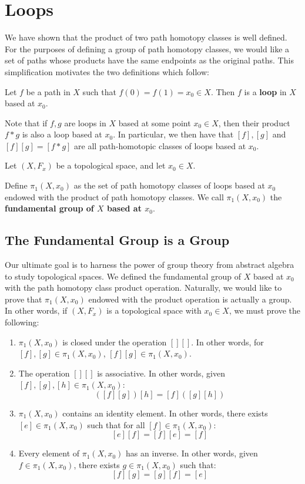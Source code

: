 

\section{Loops} We have shown that the product of two path homotopy classes is well defined. For the purposes of defining a group of path homotopy classes, we would like a set of paths whose products have the same endpoints as the original paths. This simplification motivates the two definitions which follow: 
\begin{definition}
	Let $f$ be a path in $X$ such that $f(0) = f(1) = x_0\in X$. Then $f$ is a \textbf{loop} in $X$ based at $x_0$. 
\end{definition}

Note that if $f,g$ are loops in $X$ based at some point $x_0\in X$, then their product $f*g$ is also a loop based at $x_0$. In particular, we then have that $[f],[g]$ and $[f][g] = [f*g]$ are all path-homotopic classes of loops based at $x_0$. 
\begin{definition}
	Let $(X,F_x)$ be a topological space, and let $x_0\in X$. 
	
	Define $\pi_1(X,x_0)$ as the set of path homotopy classes of loops based at $x_0$ endowed with the product of path homotopy classes. We call $\pi_1(X,x_0)$ the \textbf{fundamental group of $X$ based at $x_0$}. 
\end{definition}

\subsection{The Fundamental Group is a Group}

Our ultimate goal is to harness the power of group theory from abstract algebra to study topological spaces. We defined the fundamental group of $X$ based at $x_0$ with the path homotopy class product operation. Naturally, we would like to prove that $\pi_1(X,x_0)$ endowed with the product operation is actually a group. In other words, if $(X,F_x)$ is a topological space with $x_0\in X$, we must prove the following: 
\begin{enumerate}
	\item $\pi_1(X,x_0)$ is closed under the operation $[][]$. In other words, for $[f],[g]\in \pi_1(X,x_0)$, $[f][g] \in \pi_1(X,x_0)$. 
	\item The operation $[][]$ is associative. In other words, given $[f],[g],[h]\in \pi_1(X,x_0)$:
	\[ ([f][g])[h] = [f]([g][h])\]
	\item $\pi_1(X,x_0)$ contains an identity element. In other words, there exists $[e]\in \pi_1(X,x_0)$ such that for all $[f]\in\pi_1(X,x_0)$:
	\[[e][f] = [f][e] = [f]\]
	\item Every element of $\pi_1(X,x_0)$ has an inverse. In other words, given $f\in \pi_1(X,x_0)$, there exists $g\in \pi_1(X,x_0)$ such that:
	\[[f][g] = [g][f] = [e]\]
\end{enumerate}

